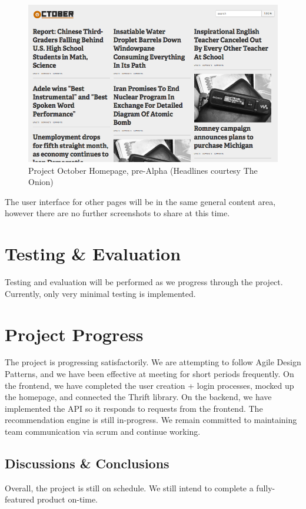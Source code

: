 \documentclass[11pt,letterpaper]{article}
\begin{document}
\begin{figure}
\centering
\includegraphics[scale=0.35]{img/homepage.png}
\caption{Project October Homepage, pre-Alpha (Headlines courtesy The Onion)}
\label{fig:homepage}
\end{figure}

The user interface for other pages will be in the same general content area, however there are no further screenshots to share at this time.

\section{Testing \& Evaluation}
Testing and evaluation will be performed as we progress through the project. Currently, only very minimal testing is implemented.

\section{Project Progress}
The project is progressing satisfactorily.
We are attempting to follow Agile Design Patterns, and we have been effective at meeting for short periods frequently.
On the frontend, we have completed the user creation + login processes, mocked up the homepage, and connected the Thrift library.
On the backend, we have implemented the API so it responds to requests from the frontend. The recommendation engine is still in-progress.
We remain committed to maintaining team communication via scrum and continue working.

\subsection{Discussions \& Conclusions}
Overall, the project is still on schedule. We still intend to complete a fully-featured product on-time.
\end{document}
